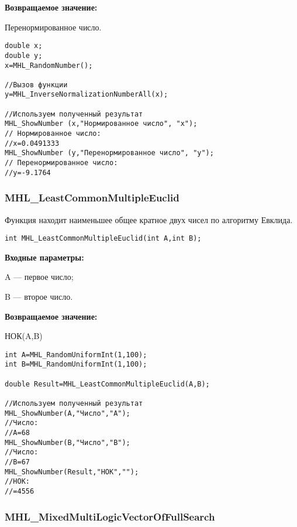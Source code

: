\documentclass[a4paper,12pt]{article}
\begin{document}
\textbf{Возвращаемое значение:}
 
Перенормированное число.


\begin{lstlisting}[label=code_use_MHL_InverseNormalizationNumberAll,caption=Пример использования]
double x;
double y;
x=MHL_RandomNumber();

//Вызов функции
y=MHL_InverseNormalizationNumberAll(x);

//Используем полученный результат
MHL_ShowNumber (x,"Нормированное число", "x");
// Нормированное число:
//x=0.0491333
MHL_ShowNumber (y,"Перенормированное число", "y");
// Перенормированное число:
//y=-9.1764
\end{lstlisting}

\subsubsection{MHL\_LeastCommonMultipleEuclid}\label{MHL_LeastCommonMultipleEuclid}

Функция находит наименьшее общее кратное двух чисел по алгоритму Евклида.


\begin{lstlisting}[label=code_syntax_MHL_LeastCommonMultipleEuclid,caption=Синтаксис]
int MHL_LeastCommonMultipleEuclid(int A,int B);
\end{lstlisting}

\textbf{Входные параметры:}  
 
A --- первое число;
 
B --- второе число.

\textbf{Возвращаемое значение:}
 
 НОК(A,B)


\begin{lstlisting}[label=code_use_MHL_LeastCommonMultipleEuclid,caption=Пример использования]
int A=MHL_RandomUniformInt(1,100);
int B=MHL_RandomUniformInt(1,100);

double Result=MHL_LeastCommonMultipleEuclid(A,B);

//Используем полученный результат
MHL_ShowNumber(A,"Число","A");
//Число:
//A=68
MHL_ShowNumber(B,"Число","B");
//Число:
//B=67
MHL_ShowNumber(Result,"НОК","");
//НОК:
//=4556
\end{lstlisting}

\subsubsection{MHL\_MixedMultiLogicVectorOfFullSearch}\label{MHL_MixedMultiLogicVectorOfFullSearch}
\end{document}
